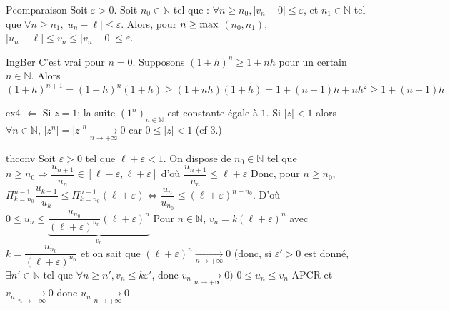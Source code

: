 \documentclass[12pt,a4paper]{report}
\begin{document}
\begin{demonstration}{Pcomparaison}
Soit $\varepsilon > 0$. Soit $n_0 \in \mathbb{N}$ tel que : $\forall n \geq n_0, \lvert v_n-0 \rvert \leq \varepsilon$, \newline et $n_1 \in \mathbb{N}$ tel que $\forall n \geq n_1, \lvert u_n -\ell \rvert \leq \varepsilon$.
\newline Alors, pour $n \geq \rm{max}$ $(n_0,n_1)$, $\lvert u_n-\ell \rvert \leq v_n \leq \lvert v_n-0 \rvert \leq \varepsilon$.
\end{demonstration}

\begin{demonstration}{IngBer}
C'est vrai pour $n=0$.
\newline Supposons $(1+h)^n \geq 1+nh$ pour un certain $n \in \mathbb{N}$. 
\newline Alors $(1+h)^{n+1} = (1+h)^n(1+h) \geq (1+nh)(1+h) = 1+(n+1)h+nh^2 \geq 1+(n+1)h$
\end{demonstration}

\begin{demonstration}{ex4}
$\Longleftarrow$ Si $z=1$; la suite $(1^n)_{n \in \mathbb{N}}$ est constante égale à $1$.
Si $\lvert z \rvert < 1$ alors $\forall n \in \mathbb{N}$, $\lvert z^n \rvert = \lvert z \rvert ^n \xrightarrow[n \rightarrow +\infty]{} 0$ car $0 \leq \lvert z \rvert < 1$ (cf 3.)
\end{demonstration}

\begin{demonstration}{thconv}
Soit $\varepsilon > 0$ tel que $\ell + \varepsilon < 1$. On dispose de $n_0 \in \mathbb{N}$ tel que $n \geq n_0 \Longrightarrow \dfrac{u_{n+1}}{u_n} \in \left[\ell-\varepsilon,\ell+\varepsilon \right]$ 
\newline d'où $\dfrac{u_{n+1}}{u_n} \leq \ell + \varepsilon$
\newline \newline Donc, pour $n \geq n_0$, $\Pi_{k=n_0}^{n-1} \dfrac{u_{k+1}}{u_k} \leq \Pi_{k=n_0}^{n-1} (\ell+\varepsilon) \Longleftrightarrow \dfrac{u_n}{u_{n_0}} \leq (\ell + \varepsilon)^{n-n_0}$.
\newline D'où $0 \leq u_n \leq \underbrace{\dfrac{u_{n_0}}{(\ell + \varepsilon)^{n_0}}(\ell + \varepsilon)^n}_{v_n}$
\newline Pour $n \in \mathbb{N}$, $v_n = k(\ell + \varepsilon)^n$ avec $k=\dfrac{u_{n_0}}{(\ell + \varepsilon)^{n_0}}$
\newline et on sait que $(\ell + \varepsilon)^n \xrightarrow[n \rightarrow +\infty]{} 0$ (donc, si $\varepsilon' > 0$ est donné, $\exists n' \in \mathbb{N}$ tel que $\forall n \geq n', v_n \leq k\varepsilon'$, donc $v_n \xrightarrow[n \rightarrow +\infty]{} 0)$
\newline $0 \leq u_n \leq v_n$ APCR et $v_n \xrightarrow[n \rightarrow +\infty]{} 0$ donc $u_n \xrightarrow[n \rightarrow + \infty]{} 0$
\end{demonstration}
\end{document}
